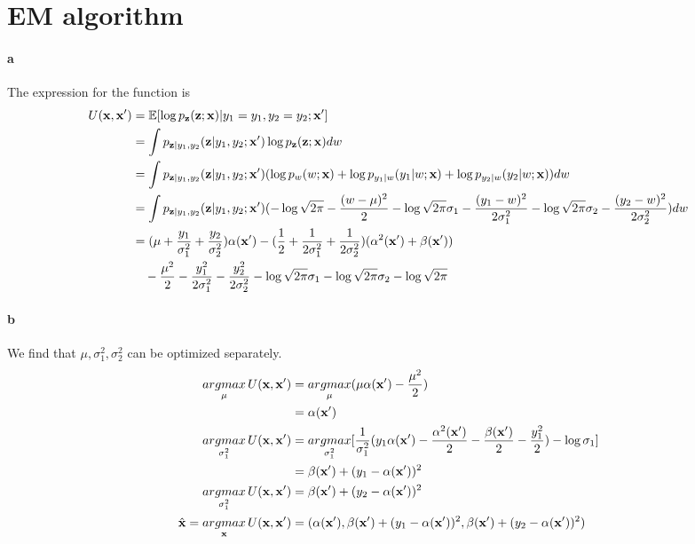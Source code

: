 \documentclass{article}
\begin{document}
\section{EM algorithm}
\paragraph{a}
The expression for the function is
\begin{align}
	U(\mathbf{x},\mathbf{x}')&=\mathbb{E}[\log p_{\mathbf{z}}(\mathbf{z};\mathbf{x})|y_1=y_1,y_2=y_2;\mathbf{x}']\notag\\
	&=\int p_{\mathbf{z}|y_1,y_2}(\mathbf{z}|y_1,y_2;\mathbf{x}')\log p_{\mathbf{z}}(\mathbf{z};\mathbf{x})dw\notag\\
	&=\int p_{\mathbf{z}|y_1,y_2}(\mathbf{z}|y_1,y_2;\mathbf{x}')(\log p_{w}(w;\mathbf{x})+\log p_{y_1|w}(y_1|w;\mathbf{x})+\log p_{y_2|w}(y_2|w;\mathbf{x}))dw\notag\\
	&=\int p_{\mathbf{z}|y_1,y_2}(\mathbf{z}|y_1,y_2;\mathbf{x}')(-\log \sqrt{2\pi}-\frac{(w-\mu)^2}{2}-\log \sqrt{2\pi}\sigma_1-\frac{(y_1-w)^2}{2\sigma_1^2}-\log \sqrt{2\pi}\sigma_2-\frac{(y_2-w)^2}{2\sigma_2^2})dw\notag\\
	&=(\mu+\frac{y_1}{\sigma_1^2}+\frac{y_2}{\sigma_2^2})\alpha(\mathbf{x}')-(\frac{1}{2}+\frac{1}{2\sigma_1^2}+\frac{1}{2\sigma_2^2})(\alpha^2(\mathbf{x}')+\beta(\mathbf{x}'))\\
	&\quad-\frac{\mu^2}{2}-\frac{y_1^2}{2\sigma^2_1}-\frac{y_2^2}{2\sigma^2_2}-\log \sqrt{2\pi}\sigma_1-\log \sqrt{2\pi}\sigma_2-\log \sqrt{2\pi}\notag
\end{align}
\paragraph{b}
We find that $\mu, \sigma_1^2, \sigma_2^2$ can be optimized separately. 
\begin{align}
	\mathop{argmax}_{\mu}U(\mathbf{x},\mathbf{x}')&=\mathop{argmax}_{\mu}(\mu\alpha(\mathbf{x}')-\frac{\mu^2}{2})\notag\\
	&=\alpha(\mathbf{x}')\notag\\
	\mathop{argmax}_{\sigma_1^2}U(\mathbf{x},\mathbf{x}')&=\mathop{argmax}_{\sigma_1^2}[\frac{1}{\sigma_1^2}(y_1\alpha(\mathbf{x}')-\frac{\alpha^2(\mathbf{x}')}{2}-\frac{\beta(\mathbf{x}')}{2}-\frac{y_1^2}{2})-\log\sigma_1]\notag\\
	&=\beta(\mathbf{x}')+(y_1-\alpha(\mathbf{x}'))^2\notag\\
	\mathop{argmax}_{\sigma_1^2}U(\mathbf{x},\mathbf{x}')&=\beta(\mathbf{x}')+(y_2-\alpha(\mathbf{x}'))^2\notag\\
	\hat{\mathbf{x}}=\mathop{argmax}_{\mathbf{x}}U(\mathbf{x},\mathbf{x}')&=(\alpha(\mathbf{x}'),\beta(\mathbf{x}')+(y_1-\alpha(\mathbf{x}'))^2,\beta(\mathbf{x}')+(y_2-\alpha(\mathbf{x}'))^2)
\end{align}
\end{document}
